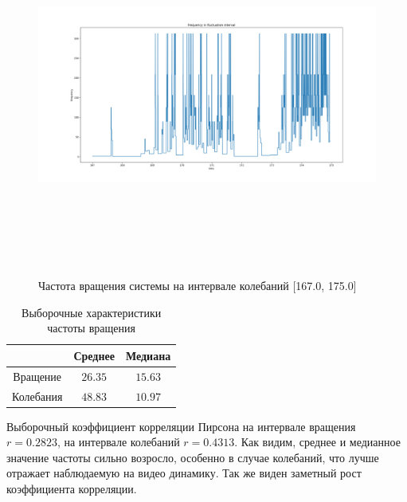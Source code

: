 \documentclass[a4paper,12pt]{article} %
\begin{document}
	\begin{figure}[H]
		
		\includegraphics[width = 18cm, height = 12cm]{Fluct_dropped.png}
		\caption{Частота вращения системы на интервале колебаний [167.0, 175.0]}
		\label{fig:fluct_dropped}
	\end{figure}

	\begin{table}[H]
		\caption{Выборочные характеристики частоты вращения}
		\label{tab:my_label3}
		\begin{center}
			\vspace{5mm}
			\begin{tabular}{|c|c|c|}
				\hline
				& Среднее & Медиана\\
				\hline
				Вращение & $ 26.35 $ & $ 15.63 $\\
				\hline
				Колебания & $ 48.83 $ & $ 10.97 $\\
				\hline
			\end{tabular}
		\end{center}
	\end{table}

	Выборочный коэффициент корреляции Пирсона на интервале вращения $r = 0.2823$, на интервале колебаний $r = 0.4313$.
	\newline Как видим, среднее и медианное значение частоты сильно возросло, особенно в случае колебаний, что лучше отражает наблюдаемую на видео динамику. Так же виден заметный рост коэффициента корреляции.
	
\end{document}
